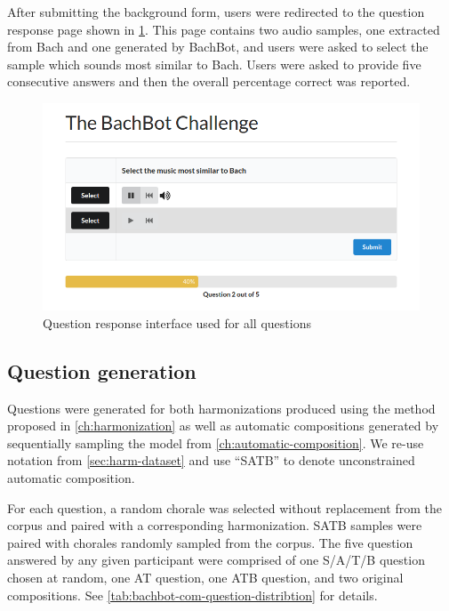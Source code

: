 After submitting the background form, users were redirected to the question
response page shown in \cref{fig:question-screen}. This page contains two
audio samples, one extracted from Bach and one generated by BachBot, and users
were asked to select the sample which sounds most similar to Bach. Users were
asked to provide five consecutive answers and then the overall percentage
correct was reported.

\begin{figure}[tb]
  \centering
  \includegraphics[width=1.0\linewidth]{question-screen.png}
  \caption{Question response interface used for all questions}
  \label{fig:question-screen}
\end{figure}

\subsection{Question generation}

Questions were generated for both harmonizations produced using the method
proposed in \cref{ch:harmonization} as well as automatic compositions generated
by sequentially sampling the model from \cref{ch:automatic-composition}. We
re-use notation from \cref{sec:harm-dataset} and use ``SATB'' to denote
unconstrained automatic composition.

For each question, a random chorale was selected without replacement from the
corpus and paired with a corresponding harmonization. SATB samples were paired
with chorales randomly sampled from the corpus. The five question answered by
any given participant were comprised of one S/A/T/B question chosen at random,
one AT question, one ATB question, and two original compositions. See
\cref{tab:bachbot-com-question-distribtion} for details.

